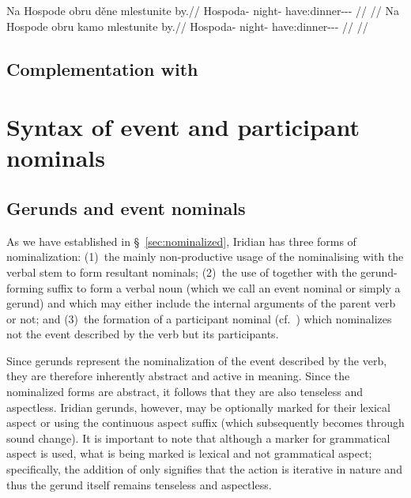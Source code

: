 \pex
\a
\begingl
  \gla Na Hospode obru děne mlestunite by.//
  \glb \Loc{} Hospoda-\Acc{} night-\Ins{} \Spec{} have:dinner-\Lv{}-\SupP{}-\Cnj{} \Quot{}//
  \glft {}//
\endgl
\a
\begingl
  \gla Na Hospode obru kamo mlestunite by.//
  \glb \Loc{} Hospoda-\Acc{} night-\Ins{} \Rep{} have:dinner-\Lv{}-\SupP{}-\Cnj{} \Quot{}//
  \glft {}//
\endgl
\xe

\subsection{Complementation with }
\label{sec:complementation-no}

\section{Syntax of event and participant nominals}\label{sec:nomz-syntax}

\subsection{Gerunds and event nominals}

As we have established in \S~\ref{sec:nominalized}, Iridian has three forms of
nominalization: (1)~the mainly non-productive usage of the
nominalising  with the verbal stem to form resultant nominals; (2)~the
use of  together with the gerund-forming suffix 
to form a verbal noun (which we call an event nominal or simply a gerund) and
which may either include the internal arguments of the parent verb or not; and
(3)~the formation of a participant nominal (cf.~\cite{okuna}) which nominalizes
not the event described by the verb but its participants.

Since gerunds represent the nominalization of the
event described by the verb, they are therefore inherently
abstract and active in meaning. Since the nominalized forms are abstract, it
follows that they are also tenseless and aspectless. Iridian gerunds, however,
may be optionally marked for their lexical aspect or 
 using the continuous aspect suffix 
(which subsequently becomes  through sound change). It is important to
note that although a marker for grammatical aspect is used,
what is being marked is lexical and not grammatical aspect; specifically, the
addition of  only signifies that the action is iterative in nature and
thus the gerund itself remains tenseless and aspectless.

